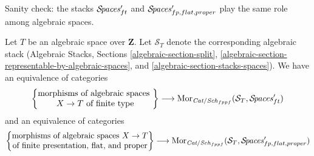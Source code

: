 \noindent
Sanity check: the stacks $\mathcal{S}\!\mathit{paces}'_{ft}$ and
$\mathcal{S}\!\mathit{paces}'_{fp, flat, proper}$
play the same role among algebraic spaces.

\begin{lemma}
\label{lemma-extend-spaces-to-spaces}
Let $T$ be an algebraic space over $\mathbf{Z}$. Let $\mathcal{S}_T$
denote the corresponding algebraic stack (Algebraic Stacks, Sections
\ref{algebraic-section-split},
\ref{algebraic-section-representable-by-algebraic-spaces}, and
\ref{algebraic-section-stacks-spaces}).
We have an equivalence of categories
$$
\left\{
\begin{matrix}
\text{morphisms of algebraic spaces }\\
X \to T\text{ of finite type}
\end{matrix}
\right\}
\longrightarrow
\mathop{\mathrm{Mor}}\nolimits_{\textit{Cat}/\mathit{Sch}_{fppf}}(\mathcal{S}_T, \mathcal{S}\!\mathit{paces}'_{ft})
$$
and an equivalence of categories
$$
\left\{
\begin{matrix}
\text{morphisms of algebraic spaces }X \to T\\
\text{of finite presentation, flat, and proper}
\end{matrix}
\right\}
\longrightarrow
\mathop{\mathrm{Mor}}\nolimits_{\textit{Cat}/\mathit{Sch}_{fppf}}(\mathcal{S}_T,
\mathcal{S}\!\mathit{paces}'_{fp, flat, proper})
$$
\end{lemma}

